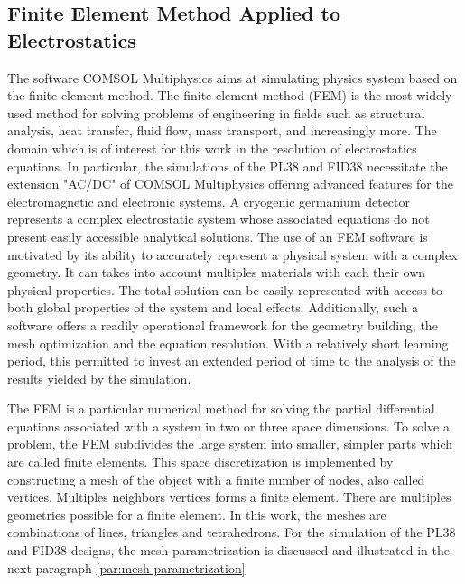 \subsection{Finite Element Method Applied to Electrostatics}

The software COMSOL Multiphysics aims at simulating physics system based on the finite element method. 
The finite element method (FEM) is the most widely used method for solving problems of engineering in fields such as structural analysis, heat transfer, fluid flow, mass transport, and increasingly more. The domain which is of interest for this work in the resolution of electrostatics equations. In particular, the simulations of the PL38 and FID38 necessitate the extension "AC/DC" of COMSOL Multiphysics offering advanced features for the electromagnetic and electronic systems.
A cryogenic germanium detector represents a complex electrostatic system whose associated equations do not present easily accessible analytical solutions. The use of an FEM software is motivated by its ability to accurately represent a physical system with a complex geometry. It can takes into account multiples materials with each their own physical properties. The total solution can be easily represented with access to both global properties of the system and local effects. Additionally, such a software offers a readily operational framework for the geometry building, the mesh optimization and the equation resolution. With a relatively short learning period, this permitted to invest an extended period of time to the analysis of the results yielded by the simulation. 

The FEM is a particular numerical method for solving the partial differential equations associated with a system in two or three space dimensions. 
To solve a problem, the FEM subdivides the large system into smaller, simpler parts which are called finite elements. This space discretization is implemented by constructing a mesh of the object with a finite number of nodes, also called vertices. Multiples neighbors vertices forms a finite element. There are multiples geometries possible for a finite element. In this work, the meshes are combinations of lines, triangles and tetrahedrons. For the simulation of the PL38 and FID38 designs, the mesh parametrization is discussed and illustrated in the next paragraph \ref{par:mesh-parametrization}



